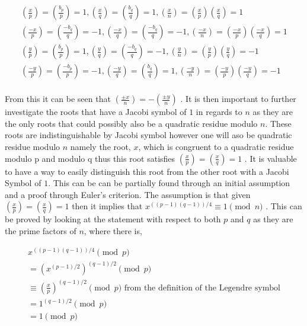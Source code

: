 \documentclass{article}
\begin{document}
$$
\begin{array}{l}
\left(\frac{x}{p}\right) = \left(\frac{b_p}{p}\right) = 1, \left(\frac{x}{q}\right) = \left(\frac{b_q}{q}\right) = 1, \left(\frac{x}{n}\right) = \left(\frac{x}{p}\right)  \left(\frac{x}{q}\right) = 1 \\
\left(\frac{-x}{p}\right) = \left(\frac{-b_q}{q}\right) = -1, \left(\frac{-x}{q}\right) = \left(\frac{-b_q}{q}\right) = -1, \left(\frac{-x}{n}\right) = \left(\frac{-x}{p}\right)  \left(\frac{-x}{q}\right) = 1 \\
\left(\frac{y}{p}\right) = \left(\frac{b_p}{p}\right) = 1, \left(\frac{y}{q}\right) = \left(\frac{-b_q}{q}\right) = -1, \left(\frac{y}{n}\right) = \left(\frac{y}{p}\right)  \left(\frac{y}{q}\right) = -1 \\
\left(\frac{-y}{p}\right) = \left(\frac{-b_p}{p}\right) = -1, \left(\frac{-y}{q}\right) = \left(\frac{b_q}{q}\right) = 1, \left(\frac{-y}{n}\right) = \left(\frac{-y}{p}\right)  \left(\frac{-y}{q}\right) = -1 \\
\end{array}
$$

From this it can be seen that $\left(\frac{\pm x}{n}\right)= -\left(\frac{\pm y}{n}\right)$ \cite{Mora2013}. It is then important to further investigate the roots that have a Jacobi symbol of $1$ in regards to $n$ as they are the only roots that could possibly also be a quadratic residue modulo $n$. These roots are indistinguishable by Jacobi symbol however one will aso be quadratic residue modulo $n$ namely the root, $x$, which is congruent to a quadratic residue modulo p and modulo q thus this root satisfies $\left(\frac{x}{p}\right) = \left(\frac{x}{q}\right) = 1$ \cite{Mora2013}. It is valuable to have a way to easily distinguish this root from the other root with a Jacobi Symbol of $1$. This can be can be partially found through an initial assumption and a proof through Euler's criterion. The assumption is that given $\left(\frac{x}{p}\right) = \left(\frac{x}{q}\right) = 1$ then it implies that $x^{((p-1)(q-1))/4} \equiv 1 \pmod{n}$ \cite{Mora2013}. This can be proved by looking at the statement with respect to both $p$ and $q$ as they are the prime factors of $n$, where there is, 

$$
\begin{array}{l}
    x^{((p-1)(q-1))/4} \pmod{p} \\
    = (x^{(p-1)/2})^{(q-1)/2} \pmod{p} \\
    \equiv \left(\frac{x}{p}\right)^{(q-1)/2} \pmod{p} \mbox{  from the definition of the Legendre symbol} \\
    = 1^{(q-1)/2} \pmod{p}\\
    = 1 \pmod{p}
\end{array}
$$
\end{document}
